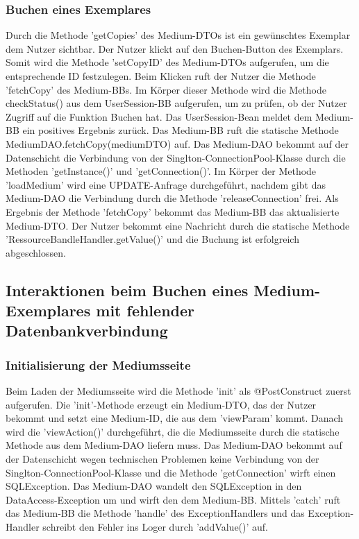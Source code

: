 \documentclass{article}
\begin{document}
\subsubsection{Buchen eines Exemplares}
Durch die Methode 'getCopies' des Medium-DTOs ist ein gewünschtes Exemplar dem Nutzer sichtbar. Der Nutzer klickt auf den Buchen-Button des Exemplars. Somit wird die Methode 'setCopyID' des Medium-DTOs aufgerufen, um die entsprechende ID festzulegen. Beim Klicken ruft der Nutzer die Methode 'fetchCopy' des Medium-BBs. Im Körper dieser Methode wird die Methode checkStatus() aus dem UserSession-BB aufgerufen, um zu prüfen, ob der Nutzer Zugriff auf die Funktion Buchen hat. Das UserSession-Bean meldet dem Medium-BB ein positives Ergebnis zurück. Das Medium-BB ruft die statische Methode MediumDAO.fetchCopy(mediumDTO) auf. Das Medium-DAO bekommt auf der Datenschicht die Verbindung von der Singlton-ConnectionPool-Klasse durch die Methoden 'getInstance()' und 'getConnection()'. Im Körper der Methode 'loadMedium' wird eine UPDATE-Anfrage durchgeführt, nachdem gibt das Medium-DAO die Verbindung durch die Methode 'releaseConnection' frei. Als Ergebnis der Methode 'fetchCopy' bekommt das Medium-BB das aktualisierte Medium-DTO. Der Nutzer bekommt eine Nachricht durch die statische Methode 'RessourceBandleHandler.getValue()' und die Buchung ist erfolgreich abgeschlossen.
\subsection{Interaktionen beim Buchen eines Medium-Exemplares mit fehlender Datenbankverbindung}
\subsubsection{Initialisierung der Mediumsseite}
Beim Laden der Mediumsseite wird die Methode 'init' als @PostConstruct zuerst aufgerufen. Die 'init'-Methode erzeugt ein Medium-DTO, das der Nutzer bekommt und setzt eine Medium-ID, die aus dem 'viewParam' kommt. Danach wird die 'viewAction()' durchgeführt, die die Mediumsseite durch die statische Methode aus dem Medium-DAO liefern muss. Das Medium-DAO bekommt auf der Datenschicht wegen technischen Problemen keine Verbindung von der Singlton-ConnectionPool-Klasse und die Methode 'getConnection' wirft einen SQLException. Das Medium-DAO wandelt den SQLException in den DataAccess-Exception um und wirft den dem Medium-BB. Mittels 'catch' ruft das Medium-BB die Methode 'handle' des ExceptionHandlers und das Exception-Handler schreibt den Fehler ins Loger durch 'addValue()' auf. 
\end{document}
